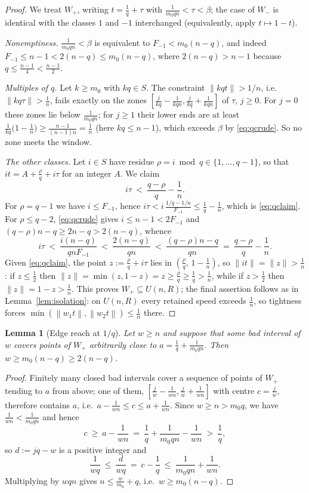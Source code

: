 \documentclass[11pt]{article}
\newtheorem{lemma}[theorem]{Lemma}
\theoremstyle{definition}
\newcommand{\norm}[1]{\left\lVert #1 \right\rVert}
\begin{document}
\begin{proof}
We treat $W_+$, writing $t=\frac1q+\tau$ with
$\frac1{m_0qn}<\tau<\beta$; the case of $W_-$ is identical with the
classes $1$ and $-1$ interchanged (equivalently, apply $t\mapsto1-t$).

\emph{Nonemptiness.}  $\frac1{m_0qn}<\beta$ is equivalent to
$F_{-1}<m_0(n-q)$, and indeed $F_{-1}\le n-1<2(n-q)\le m_0(n-q)$, where
$2(n-q)>n-1$ because $q\le\frac{n-1}4<\frac{n-1}2$.

\emph{Multiples of $q$.}  Let $k\ge m_0$ with $kq\in S$.  The constraint
$\|kqt\|>1/n$, i.e.\ $\|kq\tau\|>\frac1n$, fails exactly on the zones
$[\frac{j}{kq}-\frac1{kqn},\frac{j}{kq}+\frac1{kqn}]$ of $\tau$,
$j\ge0$.  For $j=0$ these zones lie below $\frac1{m_0qn}$; for $j\ge1$
their lower ends are at least
$\frac1{kq}\bigl(1-\frac1n\bigr)\ge\frac{n-1}{(n-1)n}=\frac1n$ (here
$kq\le n-1$), which exceeds $\beta$ by \eqref{eq:qcrude}.  So no zone
meets the window.

\emph{The other classes.}  Let $i\in S$ have residue
$\rho=i\bmod q\in\{1,\dots,q-1\}$, so that $it=A+\frac\rho q+i\tau$ for
an integer $A$.  We claim
\begin{equation}\label{eq:qclaim}
i\tau\ <\ \frac{q-\rho}{q}-\frac1n .
\end{equation}
For $\rho=q-1$ we have $i\le F_{-1}$, hence
$i\tau<i\,\frac{1/q-1/n}{F_{-1}}\le\frac1q-\frac1n$, which is
\eqref{eq:qclaim}.  For $\rho\le q-2$, \eqref{eq:qcrude} gives
$i\le n-1<2F_{-1}$ and $(q-\rho)n-q\ge 2n-q>2(n-q)$, whence
\[
i\tau\ <\ \frac{i(n-q)}{qnF_{-1}}\ <\ \frac{2(n-q)}{qn}\
<\ \frac{(q-\rho)n-q}{qn}\ =\ \frac{q-\rho}{q}-\frac1n .
\]
Given \eqref{eq:qclaim}, the point $z:=\frac\rho q+i\tau$ lies in
$(\frac\rho q,\,1-\frac1n)$, so $\|it\|=\|z\|>\frac1n$: if $z\le\frac12$
then $\|z\|=\min(z,1-z)=z\ge\frac\rho q\ge\frac1q>\frac1n$, while if
$z>\frac12$ then $\|z\|=1-z>\frac1n$.  This proves
$W_+\subseteq U(n,R)$; the final assertion follows as in
Lemma~\ref{lem:isolation}: on $U(n,R)$ every retained speed exceeds
$\frac1n$, so tightness forces
$\min(\norm{w_1t},\norm{w_2t})\le\frac1n$ there.
\end{proof}

\begin{lemma}[Edge reach at $1/q$]\label{lem:qedge}
Let $w\ge n$ and suppose that some bad interval of $w$ covers points of
$W_+$ arbitrarily close to $a=\frac1q+\frac1{m_0qn}$.  Then
$w\ge m_0(n-q)\ge2(n-q)$.
\end{lemma}

\begin{proof}
Finitely many closed bad intervals cover a sequence of points of $W_+$
tending to $a$ from above; one of them,
$[\frac jw-\frac1{wn},\frac jw+\frac1{wn}]$ with centre $c=\frac jw$,
therefore contains $a$, i.e.\ $a-\frac1{wn}\le c\le a+\frac1{wn}$.  Since
$w\ge n>m_0q$, we have $\frac1{wn}<\frac1{m_0qn}$ and hence
\[
c\ \ge\ a-\frac1{wn}\ =\ \frac1q+\frac1{m_0qn}-\frac1{wn}\ >\ \frac1q,
\]
so $d:=jq-w$ is a positive integer and
\[
\frac1{wq}\ \le\ \frac{d}{wq}\ =\ c-\frac1q\ \le\ \frac1{m_0qn}+\frac1{wn}.
\]
Multiplying by $wqn$ gives $n\le\frac{w}{m_0}+q$, i.e.\
$w\ge m_0(n-q)$.
\end{proof}
\end{document}
